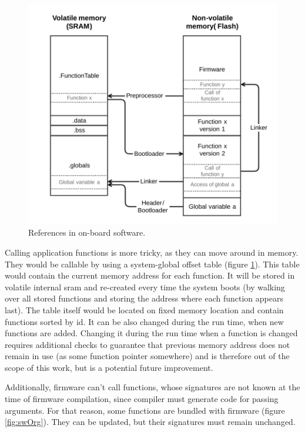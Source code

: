 \begin{figure}[t]
	\centering
	\includegraphics[width=\textwidth]{figures/Software_linking.pdf}
	\caption{References in on-board software.}
	\label{fig:swLink}
\end{figure}

Calling application functions is more tricky, as they can move around in memory. They would be callable by using a system-global offset table (figure \ref{fig:swLink}). This table would contain the current memory address for each function. It will be stored in volatile internal \gls{sram} and re-created every time the system boots (by walking over all stored functions and storing the address where each function appears last). The table itself would be located on fixed memory location and contain functions sorted by id. It can be also changed during the run time, when new functions are added. Changing it during the run time when a function is changed requires additional checks to guarantee that previous memory address does not remain in use (as some function pointer somewhere) and is therefore out of the scope of this work, but is a potential future improvement.

Additionally, firmware can't call functions, whose signatures are not known at the time of firmware compilation, since compiler must generate code for passing arguments. For that reason, some functions  are bundled with firmware (figure \ref{fig:swOrg}). They can be updated, but their signatures must remain unchanged.

